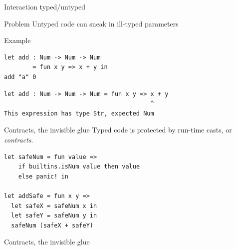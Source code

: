 \documentclass[t, aspectratio=169]{beamer}
\begin{document}
\begin{frame}[fragile]{Interaction typed/untyped}

\begin{alertblock}{Problem}
Untyped code can sneak in ill-typed parameters
\end{alertblock}

\vspace{10pt}

\begin{exampleblock}{Example}
\begin{lstlisting}[language=Nickel]
let add : Num -> Num -> Num
        = fun x y => x + y in
add "a" 0
\end{lstlisting}

\begin{lstlisting}[language=Terminal,style=Terminal]
let add : Num -> Num -> Num = fun x y => x + y
                                         ^
This expression has type Str, expected Num
\end{lstlisting}
\end{exampleblock}
\end{frame}

\begin{frame}[fragile]{Contracts, the invisible glue}
Typed code is protected by run-time casts, or \emph{contracts}.

\vspace{10pt}

\begin{lstlisting}[language=Nickel,title={Generated code for \lstinline+add+}]
let safeNum = fun value =>
    if builtins.isNum value then value
    else panic! in

let addSafe = fun x y =>
  let safeX = safeNum x in
  let safeY = safeNum y in
  safeNum (safeX + safeY)
\end{lstlisting}
\end{frame}

\begin{frame}{Contracts, the invisible glue}
\end{frame}
\end{document}
